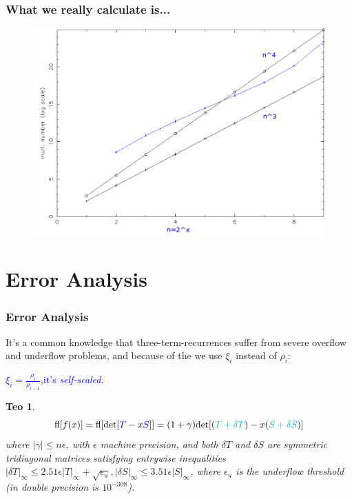 \documentclass{beamer}
\theoremstyle{definition} \newtheorem{de}{Def}
\theoremstyle{remark} \newtheorem{os}[de]{Remark}
\theoremstyle{plain} \newtheorem{te}[de]{Teo}
\theoremstyle{plain} \newtheorem{co}[de]{Cor}
\theoremstyle{plain} \newtheorem{pr}[de]{Prop}
\theoremstyle{plain} \newtheorem{lem}[de]{Lemm}
\theoremstyle{remark} \newtheorem{rem}[de]{Remark}
\begin{document}
\begin{frame}
  \frametitle{What we really calculate is...}

  \begin{figure}
    \centering
    \includegraphics[scale=0.3]{images/NumeroMoltiplicazioni_9_Modificato.pdf}
  \end{figure}
  
\end{frame}


\section{Error Analysis}

\begin{frame}
  \frametitle{Error Analysis}

It's a common knowledge that three-term-recurrences suffer from severe overflow and underflow problems, and because of the we use $\xi_i$ instead of $\rho_i$: 

\pause

\textcolor{blue}{$\xi_i=\frac{\rho_i}{\rho_{i-1}}$,it's \emph{self-scaled}}.

\pause

\begin{te}
  \begin{equation*}
    \text{fl}[f(x)] = \text{fl}[\text{det}[\textcolor{blue}{T}-x\textcolor{blue}{S}]] = (1 + \gamma)\text{det}[(\textcolor{cyan}{T+ \delta T}) -x(\textcolor{cyan}{S + \delta S})]
  \end{equation*}
  where $|\gamma|\le n\epsilon$, with $\epsilon$ machine precision, and both $\delta T$ and $\delta S$ are symmetric tridiagonal matrices satisfying entrywise inequalities $|\delta T|_{\infty}\le 2.51\epsilon |T|_{\infty} + \sqrt{\epsilon_u}, |\delta S|_{\infty}\le 3.51\epsilon |S|_{\infty}$, where $\epsilon_u$ is the underflow threshold (in double precision is $10^{-308}$).
\end{te}

\end{frame}
\end{document}
